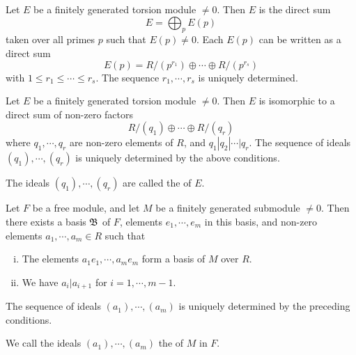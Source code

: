   \begin{thm}
    Let $E$ be a finitely generated torsion module $\neq0$. Then $E$ is the direct sum
    \begin{equation*}
      E=\bigoplus_p E(p)
    \end{equation*}
    taken over all primes $p$ such that $E(p)\neq0$.
    Each $E(p)$ can be written as a direct sum
    \begin{equation*}
      E(p)=R/(p^{r_1})\oplus\cdots\oplus R/(p^{r_s})
    \end{equation*}
    with $1\leqslant r_1\leqslant\cdots\leqslant r_s$. The sequence $r_1,\cdots,r_s$ is uniquely determined.
  \end{thm}

  \begin{thm}
    Let $E$ be a finitely generated torsion module $\neq0$. Then $E$ is isomorphic to a direct sum of non-zero factors
    \begin{equation*}
      R/(q_1)\oplus\cdots\oplus R/(q_r)
    \end{equation*}
    where $q_1,\cdots,q_r$ are non-zero elements of $R$, and $q_1|q_2|\cdots|q_r$. The sequence of ideals $(q_1),\cdots,(q_r)$ is uniquely determined by the above conditions.
  \end{thm}
  \begin{rem}
    The ideals $(q_1),\cdots,(q_r)$ are called the  of $E$.
  \end{rem}

  \begin{thm}
    Let $F$ be a free module, and let $M$ be a finitely generated submodule $\neq0$. Then there exists a basis $\mathfrak{B}$ of $F$, elements $e_1,\cdots,e_m$ in this basis, and non-zero elements $a_1,\cdots,a_m\in R$ such that
    \begin{enumerate}[(i)]
      \item The elements $a_1e_1,\cdots,a_me_m$ form a basis of $M$ over $R$.
      \item We have $a_i|a_{i+1}$ for $i=1,\cdots,m-1$.
    \end{enumerate}
    The sequence of ideals $(a_1),\cdots,(a_m)$ is uniquely determined by the preceding conditions.
  \end{thm}
  \begin{rem}
    We call the ideals $(a_1),\cdots,(a_m)$ the  of $M$ in $F$.
  \end{rem}


